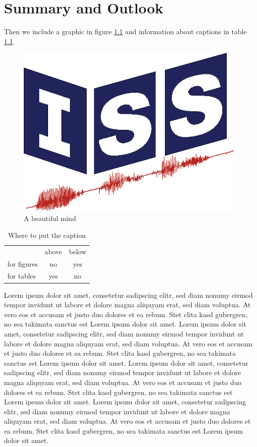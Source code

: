 \documentclass[12pt,DIV14,BCOR12mm,a4paper,footexclude,headinclude,halfparskip-,twoside,openright,openany,cleardoubleempty,idxtotoc,bibtotoc]{scrreprt} %
\numberwithin{equation}{chapter}
\begin{document}
\chapter{Summary and Outlook}

Then we include a graphic in figure \ref{mind} and information about captions in table \ref{captions}.\\
\begin{figure}
	\centering
	\includegraphics[scale=.3]{isslogocolor}
	\caption{A beautiful mind}
	\label{mind}
\end{figure}

\begin{table}
    \centering
    \caption{Where to put the caption}
    \label{captions}
    \begin{tabular}{lcc}
         & above & below\\
        for figures & no & yes\\
        for tables & yes & no\\
    \end{tabular}
\end{table}


Lorem ipsum dolor sit amet, consetetur sadipscing elitr, sed diam nonumy eirmod tempor invidunt ut labore et dolore magna aliquyam erat, sed diam voluptua. At vero eos et accusam et justo duo dolores et ea rebum. Stet clita kasd gubergren, no sea takimata sanctus est Lorem ipsum dolor sit amet. Lorem ipsum dolor sit amet, consetetur sadipscing elitr, sed diam nonumy eirmod tempor invidunt ut labore et dolore magna aliquyam erat, sed diam voluptua. At vero eos et accusam et justo duo dolores et ea rebum. Stet clita kasd gubergren, no sea takimata sanctus est Lorem ipsum dolor sit amet.
\newpage
Lorem ipsum dolor sit amet, consetetur sadipscing elitr, sed diam nonumy eirmod tempor invidunt ut labore et dolore magna aliquyam erat, sed diam voluptua. At vero eos et accusam et justo duo dolores et ea rebum. Stet clita kasd gubergren, no sea takimata sanctus est Lorem ipsum dolor sit amet. Lorem ipsum dolor sit amet, consetetur sadipscing elitr, sed diam nonumy eirmod tempor invidunt ut labore et dolore magna aliquyam erat, sed diam voluptua. At vero eos et accusam et justo duo dolores et ea rebum. Stet clita kasd gubergren, no sea takimata sanctus est Lorem ipsum dolor sit amet.
\end{document}
